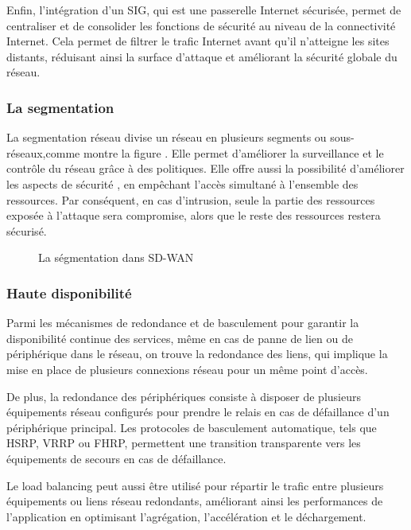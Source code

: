   Enfin, l'intégration d'un SIG, qui est une passerelle Internet sécurisée, permet de centraliser et de consolider les fonctions de sécurité au niveau de la connectivité Internet. Cela permet de filtrer le trafic Internet avant qu'il n'atteigne les sites distants, réduisant ainsi la surface d'attaque et améliorant la sécurité globale du réseau. 
\subsubsection{La segmentation }

La segmentation réseau divise un réseau en plusieurs segments ou sous-réseaux,comme montre la figure . Elle permet d'améliorer la surveillance et le contrôle du réseau grâce à des politiques. Elle offre aussi la possibilité d'améliorer les aspects de sécurité , en empêchant l'accès simultané à l'ensemble des ressources. Par conséquent, en cas d'intrusion, seule la partie des ressources exposée à l'attaque sera compromise, alors que le reste des ressources restera sécurisé.
\begin{figure} [H]

	\begin{center}
		\centering
		\hspace*{-0.5cm}

	\end{center}
	\caption{La ségmentation dans SD-WAN }
\end{figure} 
\subsubsection{Haute disponibilité  }

Parmi les mécanismes de redondance et de basculement pour garantir la disponibilité continue des services, même en cas de panne de lien ou de périphérique dans le réseau, on trouve la redondance des liens, qui implique la mise en place de plusieurs connexions réseau pour un même point d'accès. 


De plus, la redondance des périphériques consiste à disposer de plusieurs équipements réseau configurés pour prendre le relais en cas de défaillance d'un périphérique principal. 
Les protocoles de basculement automatique, tels que HSRP, VRRP ou FHRP, permettent une transition transparente vers les équipements de secours en cas de défaillance.


Le load balancing peut aussi être utilisé pour répartir le trafic entre plusieurs équipements ou liens réseau redondants, améliorant ainsi les performances de l'application en optimisant l'agrégation, l'accélération et le déchargement. 

